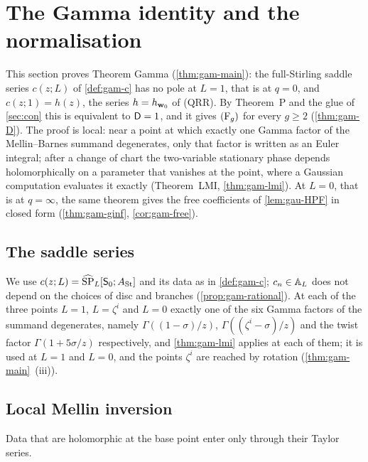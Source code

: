 
\section{The Gamma identity and the normalisation}
\label{sec:gam}

This section proves Theorem Gamma (\cref{thm:gam-main}): the full-Stirling saddle series $c(z;L)$ of \cref{def:gam-c} has no pole at $L=1$, that is at $q=0$, and $c(z;1)=h(z)$, the series $h=h_{\mathbf{w}_0}$ of (QRR). By Theorem~P and the glue of \cref{sec:con} this is equivalent to $\mathsf{D}=1$, and it gives $(\mathrm{F}_{g})$ for every $g\geq 2$ (\cref{thm:gam-D}). The proof is local: near a point at which exactly one Gamma factor of the Mellin--Barnes summand degenerates, only that factor is written as an Euler integral; after a change of chart the two-variable stationary phase depends holomorphically on a parameter that vanishes at the point, where a Gaussian computation evaluates it exactly (Theorem~LMI, \cref{thm:gam-lmi}). At $L=0$, that is at $q=\infty$, the same theorem gives the free coefficients of \cref{lem:gau-HPF} in closed form (\cref{thm:gam-ginf}, \cref{cor:gam-free}).

\subsection{The saddle series}
\label{sec:gam-series}

We use $c(z;L)=\widehat{\mathrm{SP}}_L[\mathsf S_0;A_{\mathrm{St}}]$ and its data as in \cref{def:gam-c}; $c_n\in\mathbb{A}_{L}$ does not depend on the choices of disc and branches (\cref{prop:gam-rational}). At each of the three points $L=1$, $L=\zeta^i$ and $L=0$ exactly one of the six Gamma factors of the summand degenerates, namely $\Gamma((1-\sigma)/z)$, $\Gamma((\zeta^i-\sigma)/z)$ and the twist factor $\Gamma(1+5\sigma/z)$ respectively, and \cref{thm:gam-lmi} applies at each of them; it is used at $L=1$ and $L=0$, and the points $\zeta^i$ are reached by rotation (\cref{thm:gam-main}~(iii)).

\subsection{Local Mellin inversion}
\label{sec:gam-lmi}

Data that are holomorphic at the base point enter only through their Taylor series.

